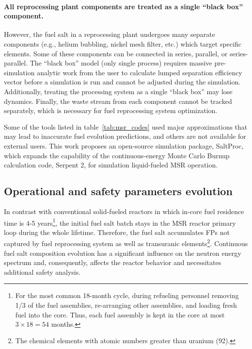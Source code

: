 \paragraph{All reprocessing plant components are treated as a single ``black 
box'' component.} However, the fuel salt in a reprocessing plant undergoes 
many separate components (e.g., helium bubbling, nickel mesh filter, etc.) 
which target specific elements. Some of these components can be connected in 
series, parallel, or series-parallel. The ``black box'' model (only single 
process) requires massive pre-simulation analytic work from the user to 
calculate lumped separation efficiency vector before a simulation is run and 
cannot be adjusted during the simulation. Additionally, treating the 
processing system as a single ``black box'' may lose dynamics. Finally, the 
waste stream from each component cannot be tracked separately, which is 
necessary for fuel reprocessing system optimization.

Some of the tools listed in table~\ref{tab:msr_codes} used major 
approximations that may lead to inaccurate fuel evolution predictions, and 
others are not available for external users. This work proposes an open-source 
simulation package, SaltProc, which expands the capability of the 
continuous-energy Monte Carlo Burnup calculation code, Serpent 2, for 
simulation liquid-fueled \gls{MSR} operation.

\subsection{Operational and safety parameters evolution} 
\label{sec:saf-par-literature}
In contrast with conventional solid-fueled reactors in which in-core fuel 
residence time is 4-5 years\footnote{For the most common 
18-month cycle, during refueling personnel removing 1/3 of the fuel 
assemblies, re-arranging other assemblies, and loading fresh fuel into the 
core. Thus, each fuel assembly is kept in the core at most $3\times 18=54$ 
months.}, the initial fuel salt batch stays in the \gls{MSR} reactor primary 
loop during the whole lifetime. Therefore, the fuel salt accumulates 
\glspl{FP} not captured by fuel reprocessing system as well as transuranic 
elements\footnote{The chemical elements with atomic numbers greater than 
uranium (92).}. Continuous fuel salt composition evolution has a 
significant influence on the neutron energy spectrum and, consequently, 
affects the reactor behavior and necessitates additional safety analysis.

